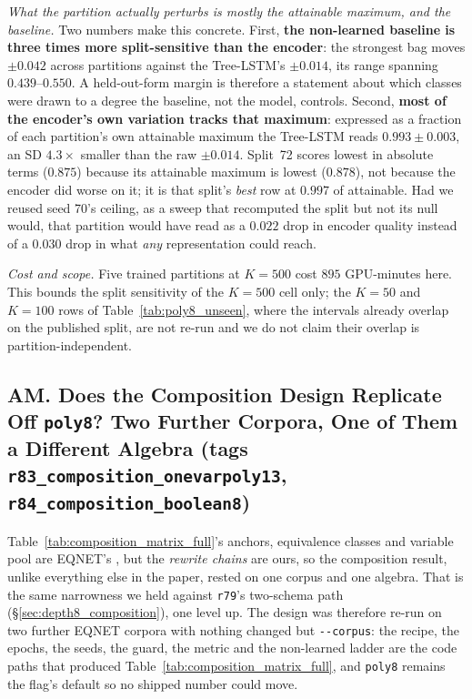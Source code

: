 \emph{What the partition actually perturbs is mostly the attainable maximum, and the baseline.} Two numbers make this concrete. First, \textbf{the non-learned baseline is three times more split-sensitive than the encoder}: the strongest bag moves $\pm 0.042$ across partitions against the Tree-LSTM's $\pm 0.014$, its range spanning $0.439$--$0.550$. A held-out-form margin is therefore a statement about which classes were drawn to a degree the baseline, not the model, controls. Second, \textbf{most of the encoder's own variation tracks that maximum}: expressed as a fraction of each partition's own attainable maximum the Tree-LSTM reads $0.993 \pm 0.003$, an SD $4.3\times$ smaller than the raw $\pm 0.014$. Split~72 scores lowest in absolute terms ($0.875$) because its attainable maximum is lowest ($0.878$), not because the encoder did worse on it; it is that split's \emph{best} row at $0.997$ of attainable. Had we reused seed 70's ceiling, as a sweep that recomputed the split but not its null would, that partition would have read as a $0.022$ drop in encoder quality instead of a $0.030$ drop in what \emph{any} representation could reach.

\emph{Cost and scope.} Five trained partitions at $K{=}500$ cost $895$ GPU-minutes here. This bounds the split sensitivity of the $K{=}500$ cell only; the $K{=}50$ and $K{=}100$ rows of Table~\ref{tab:poly8_unseen}, where the intervals already overlap on the published split, are not re-run and we do not claim their overlap is partition-independent.

\subsection*{AM. Does the Composition Design Replicate Off \texttt{poly8}? Two Further Corpora, One of Them a Different Algebra (tags \texttt{r83\_composition\_onevarpoly13}, \texttt{r84\_composition\_boolean8})}

Table~\ref{tab:composition_matrix_full}'s anchors, equivalence classes and variable pool are EQNET's \citep{allamanis2017learning}, but the \emph{rewrite chains} are ours, so the composition result, unlike everything else in the paper, rested on one corpus and one algebra. That is the same narrowness we held against \texttt{r79}'s two-schema path (\S\ref{sec:depth8_composition}), one level up. The design was therefore re-run on two further EQNET corpora with nothing changed but \texttt{-{}-corpus}: the recipe, the epochs, the seeds, the guard, the metric and the non-learned ladder are the code paths that produced Table~\ref{tab:composition_matrix_full}, and \texttt{poly8} remains the flag's default so no shipped number could move.

